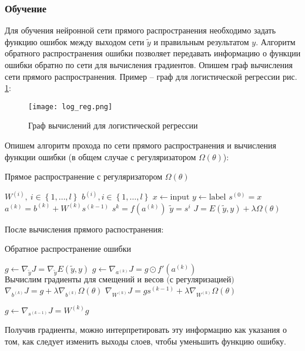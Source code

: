 \subsubsection{Обучение}
\par
Для обучения нейронной сети прямого распространения необходимо задать функцию ошибок между выходом сети $\tilde y$ и правильным результатом $y$. Алгоритм обратного распространения ошибки \cite{backpropagation} позволяет передавать информацию о функции ошибки обратно по сети для вычисления градиентов. Опишем граф вычисления сети прямого распространения. Пример -- граф для логистической регрессии рис. \ref{fig:logreg}:
\begin{figure}[H]
    \centering  
    \texttt{[image: log\_reg.png]}
    \caption{Граф вычислений для логистической регрессии}
    \label{fig:logreg}  
\end{figure}
Опишем алгоритм прохода по сети прямого распространения и вычисления функции ошибки (в общем случае с регуляризатором $\Omega(\theta)$):
\begin{algorithm}[H]
    \caption{Прямое распространение с регуляризатором $\Omega(\theta)$}\label{alg:cap}
    \begin{algorithmic}
        \State $W^{(i)}, \ i\in \left\{1, \ldots, l\right\}$
        \State $b^{(i)}, i \in \left\{1, \ldots, l\right\}$
        \State $x \gets \mathrm{input}$
        \State $y \gets \mathrm{label}$
        $s^{(0)} = x$
            \State $a^{(k)} = b^{(k)} + W^{(k)}s^{(k-1)}$
            \State $s^{k} = f(a^{(k)})$
        \EndFor
        \State $\tilde y = s^{i}$
        \State $J = E(\tilde y, y) + \lambda\Omega(\theta)$
    \end{algorithmic}
\end{algorithm}
После вычисления прямого распостранения:
\begin{algorithm}[H]
    \caption{Обратное распространение ошибки}
    \label{alg:backprop}
    \begin{algorithmic}
        \State $g \gets \nabla_{\tilde y}J = \nabla_{\tilde y} E(\tilde y, y)$
            \State $g\gets \nabla_{a^{(k)}}J = g \odot f'(a^{(k)})$
            \State $\text{Вычислим градиенты для смещений и весов (с регуляризацией)}$
            \State $\nabla_{b^{(k)}}J = g + \lambda\nabla_{b^{(k)}}\Omega(\theta)$
            \State $\nabla_{W^{(k)}}J = g s^{(k-1)} + \lambda\nabla_{W^{(k)}}\Omega(\theta)$

            \State $g \gets \nabla_{s^{(k-1)}}J = W^{(k)} g$
        \EndFor
    \end{algorithmic}
\end{algorithm}
Получив градиенты, можно интерпретировать эту информацию как указания о том, как следует изменить выходы слоев, чтобы уменьшить функцию ошибку. 